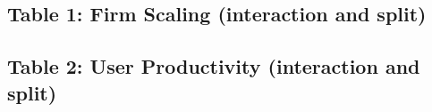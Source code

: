 \documentclass{article}
\newcommand{\cleanedresultsdir}{../results/cleaned/tex}
\newcommand{\TableInput}[2][\linewidth]{}
\begin{document}
\subsection*{Table 1: Firm Scaling (interaction and split)}
\begin{table}[H]
  \centering
  \TableInput{\cleanedresultsdir/firm_scaling_llm_equity_heterogeneity.tex}
\end{table}

\subsection*{Table 2: User Productivity (interaction and split)}
\begin{table}[H]
  \centering
  \TableInput{\cleanedresultsdir/user_productivity_llm_equity_heterogeneity_precovid.tex}
\end{table}
\end{document}
